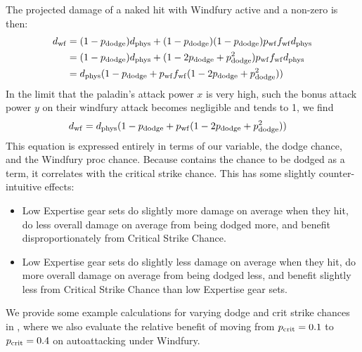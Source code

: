 The projected damage of a naked hit with Windfury active and a non-zero \pdodge is then:
\begin{equation*}
	\begin{aligned}
		d_\mathrm{wf} &= (1 - p_{\mathrm{dodge}} ) d_{\mathrm{phys}}  + (1 - p_{\mathrm{dodge}} ) (1 - p_{\mathrm{dodge}} ) p_{\mathrm{wf}}  f_{\mathrm{wf}}  d_{\mathrm{phys}} \\
		&= (1 - p_{\mathrm{dodge}} ) d_{\mathrm{phys}}  + (1 - 2p_{\mathrm{dodge}}  + p_{\mathrm{dodge}} ^2) p_{\mathrm{wf}}  f_{\mathrm{wf}}  d_{\mathrm{phys}}  \\
		&= d_{\mathrm{phys}} (1 - p_{\mathrm{dodge}}  + p_{\mathrm{wf}} f_{\mathrm{wf}} (1 - 2p_{\mathrm{dodge}}  + p_{\mathrm{dodge}} ^2))
	\end{aligned}
\end{equation*}
In the limit that the paladin's attack power $x$ is very high, such the bonus attack power $y$ on their windfury attack becomes negligible and \fwf tends to 1, we find
\begin{equation*}
	\begin{aligned}
		d_\mathrm{wf}  &= d_{\mathrm{phys}} (1 - p_{\mathrm{dodge}}  + p_{\mathrm{wf}} (1 - 2p_{\mathrm{dodge}}  + p_{\mathrm{dodge}} ^2))
	\end{aligned}
\end{equation*}
This equation is expressed entirely in terms of our \dphys variable, the dodge chance, and the Windfury proc chance.
Because \dphys contains the chance to be dodged as a term, it correlates with the critical strike chance.
This has some slightly counter-intuitive effects:
\begin{itemize}
	\item Low Expertise gear sets do slightly more damage on average when they hit, do less overall damage on average from being dodged more, and benefit disproportionately from Critical Strike Chance.
	\item Low Expertise gear sets do slightly less damage on average when they hit, do more overall damage on average from being dodged less, and benefit slightly less from Critical Strike Chance than low Expertise gear sets.
\end{itemize}
We provide some example calculations for varying dodge and crit strike chances in , where we also evaluate the relative benefit of moving from $p_{\mathrm{crit}}  = 0.1$ to $p_{\mathrm{crit}}  = 0.4$ on autoattacking under Windfury.

